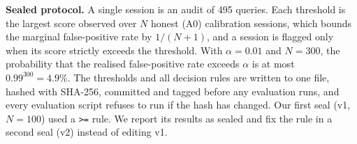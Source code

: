 \textbf{Sealed protocol.} A single session is an audit of 495 queries. Each threshold is the
largest score observed over $N$ honest (A0) calibration sessions, which bounds the marginal
false-positive rate by $1/(N+1)$, and a session is flagged only when its score strictly exceeds
the threshold. With $\alpha = 0.01$ and $N = 300$, the probability that the realised
false-positive rate exceeds $\alpha$ is at most $0.99^{300} = 4.9\%$. The thresholds and all
decision rules are written to one file, hashed with SHA-256, committed and tagged before any
evaluation runs, and every evaluation script refuses to run if the hash has changed. Our first seal
(v1, $N = 100$) used a \texttt{>=} rule. We report its results as sealed and fix the rule in a
second seal (v2) instead of editing v1.
